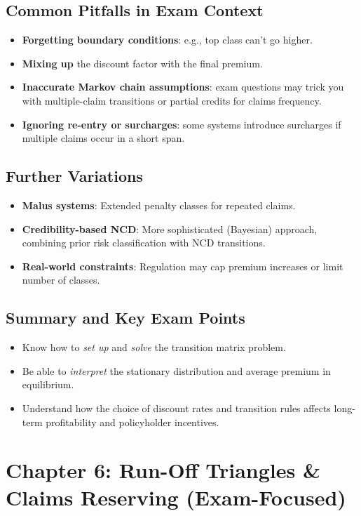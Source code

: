 \documentclass[13pt,a4paper]{article}
\begin{document}
\subsection{Common Pitfalls in Exam Context}
\begin{itemize}
  \item \textbf{Forgetting boundary conditions}: e.g., top class can’t go higher.
  \item \textbf{Mixing up} the discount factor with the final premium.
  \item \textbf{Inaccurate Markov chain assumptions}: exam questions may trick you with multiple-claim transitions or partial credits for claims frequency.
  \item \textbf{Ignoring re-entry or surcharges}: some systems introduce surcharges if multiple claims occur in a short span.
\end{itemize}

\subsection{Further Variations}
\begin{itemize}
  \item \textbf{Malus systems}: Extended penalty classes for repeated claims.
  \item \textbf{Credibility-based NCD}: More sophisticated (Bayesian) approach, combining prior risk classification with NCD transitions.
  \item \textbf{Real-world constraints}: Regulation may cap premium increases or limit number of classes.
\end{itemize}

\subsection{Summary and Key Exam Points}
\begin{itemize}
  \item Know how to \emph{set up} and \emph{solve} the transition matrix problem.
  \item Be able to \emph{interpret} the stationary distribution and average premium in equilibrium.
  \item Understand how the choice of discount rates and transition rules affects long-term profitability and policyholder incentives.
\end{itemize}

\section{Chapter 6: Run-Off Triangles \& Claims Reserving (Exam-Focused)}
\label{sec:chapter6}
\end{document}
